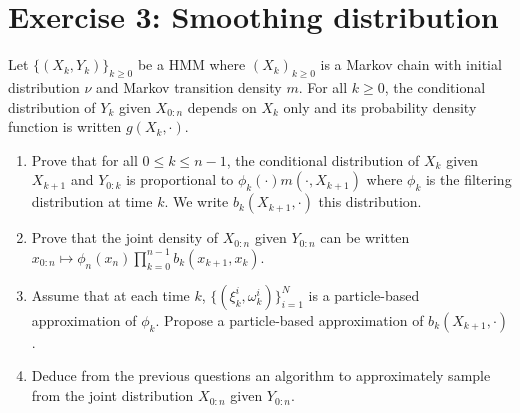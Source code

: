 \documentclass[a4paper,10pt,fleqn]{article}
\newcommand{\1}{\ensuremath{\mathbbm{1}}}
\begin{document}
\section*{Exercise 3: Smoothing distribution}
Let $\{(X_k,Y_k)\}_{k\geq 0}$ be a HMM where $(X_k)_{k\geq 0}$ is a Markov chain with initial distribution $\nu$ and Markov transition density $m$. For all $k\geq 0$, the conditional distribution of $Y_k$ given $X_{0:n}$ depends on $X_k$ only and its probability density function is written $g(X_k,\cdot)$.
\begin{enumerate}
\item Prove that for all $0\leq k\leq n-1$, the conditional distribution of $X_k$ given $X_{k+1}$ and $Y_{0:k}$ is proportional to $\phi_k(\cdot)m(\cdot,X_{k+1})$ where $\phi_k$ is the filtering distribution at time $k$. We write $b_k(X_{k+1},\cdot)$ this distribution.
\item Prove that the joint density of $X_{0:n}$ given $Y_{0:n}$ can be written $x_{0:n}\mapsto \phi_n(x_n)\prod_{k=0}^{n-1}b_k(x_{k+1},x_k)$.
\item Assume that at each time $k$, $\{(\xi_k^i,\omega_k^i)\}_{i=1}^N$ is a particle-based approximation of $\phi_k$. Propose a particle-based approximation of $b_k(X_{k+1},\cdot)$.
\item Deduce from the previous questions an algorithm to approximately sample from the joint distribution $X_{0:n}$ given $Y_{0:n}$.
\end{enumerate}
\end{document}
